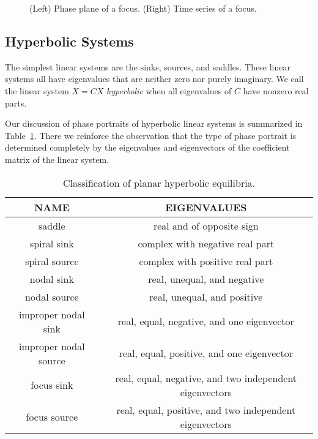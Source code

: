 \documentclass{ximera}
\begin{document}
\begin{figure}[htb]
           \centerline{%
           }
           \caption{(Left) Phase plane of a focus.
	(Right) Time series of a focus.}
           \label{F:degennodes}
\end{figure}

\subsection*{Hyperbolic Systems}

The simplest linear systems are the sinks, sources, and saddles.
These linear systems all have eigenvalues that are neither zero
nor purely imaginary.  We call the linear system $\dot{X}=CX$
{\em hyperbolic\/} when all eigenvalues of $C$ have nonzero
real parts.  

Our discussion of phase portraits of hyperbolic linear systems is
summarized in Table~\ref{T:hyperbolic}.  There we reinforce the
observation that the type of phase portrait is determined completely
by the eigenvalues and eigenvectors of the coefficient matrix of the
linear system.

\begin{table}[htb]
\begin{tabular}{|c|c|}
\hline
NAME & EIGENVALUES \\
\hline
saddle    & real and of opposite sign\\
\hline
spiral  sink & complex with negative real part \\
spiral source & complex with positive real part \\
\hline
nodal sink & real, unequal, and negative\\
nodal source & real, unequal, and positive\\
\hline
improper nodal sink & real, equal, negative, and one eigenvector\\
improper nodal source & real, equal, positive, and one eigenvector\\
\hline
focus sink & real, equal, negative, and two independent eigenvectors\\
focus source & real, equal, positive, and two independent eigenvectors\\
\hline
\end{tabular}
\caption{Classification of planar hyperbolic equilibria.}
\label{T:hyperbolic}
\end{table}
\end{document}
